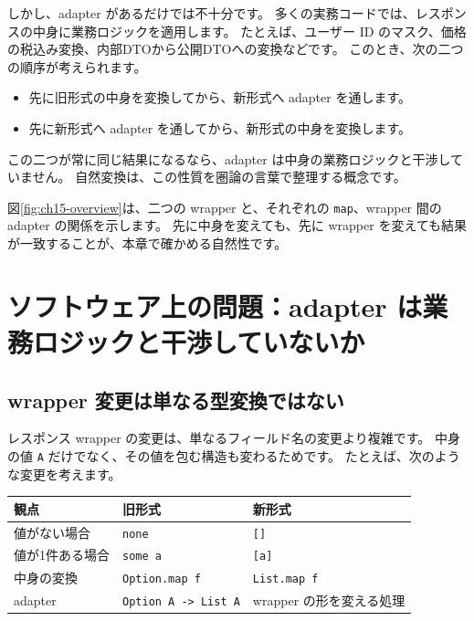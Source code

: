 しかし、adapter があるだけでは不十分です。
多くの実務コードでは、レスポンスの中身に業務ロジックを適用します。
たとえば、ユーザー ID のマスク、価格の税込み変換、内部DTOから公開DTOへの変換などです。
このとき、次の二つの順序が考えられます。

\begin{itemize}
\item 先に旧形式の中身を変換してから、新形式へ adapter を通します。
\item 先に新形式へ adapter を通してから、新形式の中身を変換します。
\end{itemize}

この二つが常に同じ結果になるなら、adapter は中身の業務ロジックと干渉していません。
自然変換は、この性質を圏論の言葉で整理する概念です。

図\ref{fig:ch15-overview}は、二つの wrapper と、それぞれの \texttt{map}、wrapper 間の adapter の関係を示します。
先に中身を変えても、先に wrapper を変えても結果が一致することが、本章で確かめる自然性です。


\section{ソフトウェア上の問題：adapter は業務ロジックと干渉していないか}

\subsection{wrapper 変更は単なる型変換ではない}

レスポンス wrapper の変更は、単なるフィールド名の変更より複雑です。
中身の値 \texttt{A} だけでなく、その値を包む構造も変わるためです。
たとえば、次のような変更を考えます。

\begin{center}
\begin{tabular}{lll}
\toprule
観点 & 旧形式 & 新形式 \\
\midrule
値がない場合 & \texttt{none} & \texttt{[]} \\
値が1件ある場合 & \texttt{some a} & \texttt{[a]} \\
中身の変換 & \texttt{Option.map f} & \texttt{List.map f} \\
adapter & \texttt{Option A -> List A} & wrapper の形を変える処理 \\
\bottomrule
\end{tabular}
\end{center}

